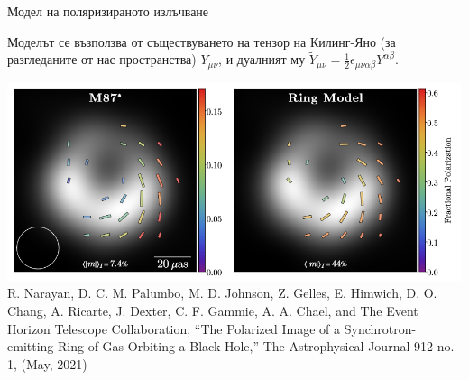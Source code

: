 \documentclass[hyperref={colorlinks,citecolor=blue,linkcolor=blue,urlcolor=blue}]{beamer}
\begin{document}
	\begin{frame}{Модел на поляризираното излъчване}
		\small
		\begin{block}{}
			Моделът се възползва от съществуването на тензор на Килинг-Яно (за разгледаните от нас пространства) $Y_{\mu\nu}$, и дуалният му $\tilde{Y}_{\mu\nu} = \frac{1}{2}\epsilon_{\mu\nu\alpha\beta}Y^{\alpha\beta}$.
		\end{block}
		
		\tiny
		\noindent
		\hspace{10cm}
		\includegraphics[scale = 0.4]{Pre-defence/M87_model_comparison.png}\\
		\tiny
		R. Narayan, D. C. M. Palumbo, M. D. Johnson, Z. Gelles, E. Himwich, D. O. Chang, A. Ricarte, J. Dexter, C. F. Gammie, A. A. Chael, and The Event Horizon Telescope Collaboration, “The Polarized Image of a Synchrotron-emitting Ring of Gas Orbiting a Black Hole,” The Astrophysical Journal 912 no. 1, (May, 2021)
	\end{frame}
	
\end{document}
